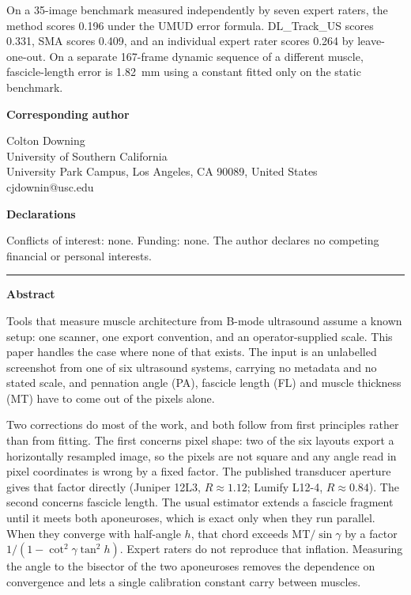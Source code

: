 \documentclass[11pt]{article}
\begin{document}
On a 35-image benchmark measured independently by seven expert raters, the
method scores 0.196 under the UMUD error formula. DL\_Track\_US scores 0.331,
SMA scores 0.409, and an individual expert rater scores 0.264 by leave-one-out.
On a separate 167-frame dynamic sequence of a different muscle, fascicle-length
error is 1.82~mm using a constant fitted only on the static benchmark.

\vspace{1.2em}

\noindent\textbf{Corresponding author}
\vspace{0.4em}

\noindent Colton Downing\\
University of Southern California\\
University Park Campus, Los Angeles, CA 90089, United States\\
cjdownin@usc.edu
\vspace{1.2em}

\noindent\textbf{Declarations}
\vspace{0.4em}

\noindent Conflicts of interest: none. Funding: none. The author declares no competing
financial or personal interests.
\vspace{1.5em}

\hrule
\vspace{1.5em}

\noindent\textbf{\large Abstract}
\vspace{0.8em}

Tools that measure muscle architecture from B-mode ultrasound assume a known
setup: one scanner, one export convention, and an operator-supplied scale. This
paper handles the case where none of that exists. The input is an unlabelled
screenshot from one of six ultrasound systems, carrying no metadata and no
stated scale, and pennation angle (PA), fascicle length (FL) and muscle
thickness (MT) have to come out of the pixels alone.

Two corrections do most of the work, and both follow from first principles
rather than from fitting. The first concerns pixel shape: two of the six layouts
export a horizontally resampled image, so the pixels are not square and any
angle read in pixel coordinates is wrong by a fixed factor. The published
transducer aperture gives that factor directly (Juniper 12L3,
$R \approx 1.12$; Lumify L12-4, $R \approx 0.84$). The second concerns fascicle
length. The usual estimator extends a fascicle fragment until it meets both
aponeuroses, which is exact only when they run parallel. When they converge with
half-angle $h$, that chord exceeds $\mathrm{MT}/\sin\gamma$ by a factor
$1/(1-\cot^{2}\gamma\tan^{2}h)$. Expert raters do not reproduce that inflation.
Measuring the angle to the bisector of the two aponeuroses removes the
dependence on convergence and lets a single calibration constant carry between
muscles.
\end{document}

